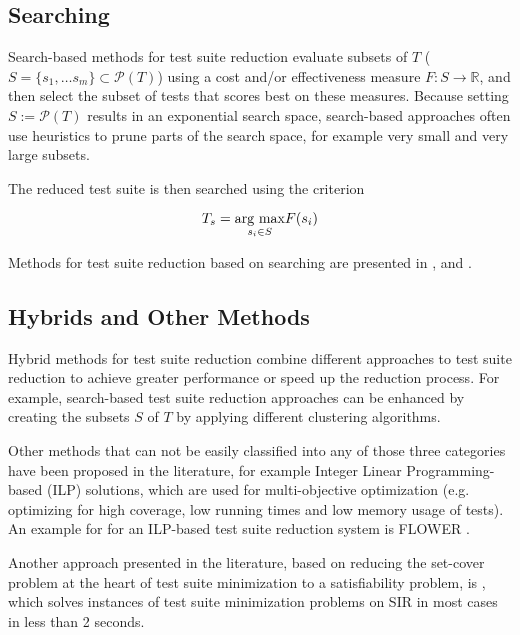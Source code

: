 \subsection{Searching}

Search-based methods for test suite reduction evaluate subsets of $T$
($S=\{s_1, \dots s_m\} \subset \mathcal{P}(T)$) using a cost and/or
effectiveness measure $F: S \rightarrow \mathbb{R}$, and then select
the subset of tests that scores best on these measures. Because setting
$S:=\mathcal{P}(T)$ results in an exponential search space, search-based
approaches often use heuristics to prune parts of the search space,
for example very small and very large subsets.

The reduced test suite is then searched using the criterion

$$T_s=\underset{s_i \in S}{\hbox{arg max}} F(s_i)$$

Methods for test suite reduction based on searching are presented in
\cite{coutinho2013test}, and \cite{wang2014cost}.

\subsection{Hybrids and Other Methods}

Hybrid methods for test suite reduction combine different approaches
to test suite reduction to achieve greater performance or speed up
the reduction process. For example, search-based test suite reduction
approaches can be enhanced by creating the subsets $S$ of $T$ by applying
different clustering algorithms.

Other methods that can not be easily classified into any of those
three categories have been proposed in the literature, for example
Integer Linear Programming-based (ILP) solutions, which are used for
multi-objective optimization (e.g. optimizing for high coverage, low
running times and low memory usage of tests). An example for for an
ILP-based test suite reduction system is FLOWER \cite{gotlieb2014flower}.

Another approach presented in the literature, based on reducing
the set-cover problem at the heart of test suite minimization
to a satisfiability problem, is \cite{arito2012application},
which solves instances of test suite minimization problems on SIR
\cite{dosupporting2005} in most cases in less than 2 seconds.
